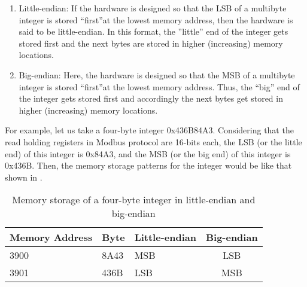 \begin{enumerate}
  \item Little-endian:
        If the hardware is designed so that the LSB of a multibyte integer is stored ``first''at the lowest memory address, then the hardware is said to be little-endian. In this format, the ''little'' end of the integer gets stored
        first and the next bytes are stored in higher (increasing) memory
        locations.
  \item Big-endian:
        Here, the hardware is designed so that the MSB of a multibyte integer is stored ``first''at the lowest memory address. Thus, the ``big'' end of the integer gets
        stored first and accordingly the next bytes get stored in higher
        (increasing) memory locations.
\end{enumerate}
For example, let us take a four-byte integer 0x436B84A3. Considering
that the read holding registers in Modbus protocol are 16-bits each, the
LSB (or the little end) of this integer is 0x84A3, and the MSB (or the big end)
of this integer is 0x436B. Then, the memory storage patterns
for the integer would be like that shown in .
\begin{table}
  \centering
  \caption{Memory storage of a four-byte integer in little-endian and big-endian}
  \label{tab:memory-storage}
  \begin{tabular}{lllc}\hline
    Memory Address & Byte & Little-endian & Big-endian \\ \hline
    3900           & 8A43 & MSB           & LSB        \\
    3901           & 436B & LSB           & MSB        \\
    \hline
  \end{tabular}
\end{table}




